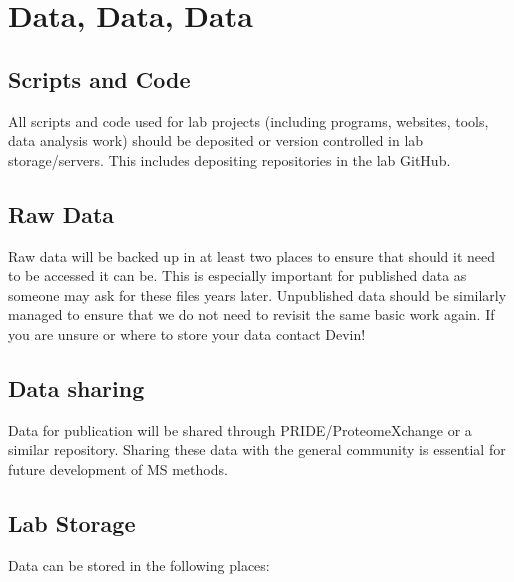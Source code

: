 \documentclass[
]{book}
\begin{document}
\hypertarget{data-data-data}{%
\section{Data, Data, Data}\label{data-data-data}}

\hypertarget{scripts-and-code}{%
\subsection{Scripts and Code}\label{scripts-and-code}}

All scripts and code used for lab projects (including programs, websites, tools, data analysis work) should be deposited or version controlled in lab storage/servers. This includes depositing repositories in the lab GitHub.

\hypertarget{raw-data}{%
\subsection{Raw Data}\label{raw-data}}

Raw data will be backed up in at least two places to ensure that should it need to be accessed it can be. This is especially important for published data as someone may ask for these files years later. Unpublished data should be similarly managed to ensure that we do not need to revisit the same basic work again. If you are unsure or where to store your data contact Devin!

\hypertarget{data-sharing}{%
\subsection{Data sharing}\label{data-sharing}}

Data for publication will be shared through PRIDE/ProteomeXchange or a similar repository. Sharing these data with the general community is essential for future development of MS methods.

\hypertarget{lab-storage}{%
\subsection{Lab Storage}\label{lab-storage}}

Data can be stored in the following places:
\end{document}
